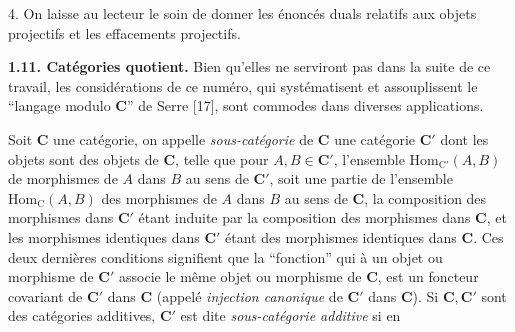  4. On laisse au lecteur le soin de donner les énoncés duals relatifs
aux objets projectifs et les effacements projectifs.

\textbf{1.11. Catégories quotient.} Bien qu'elles ne serviront pas
dans la suite de ce travail, les considérations de ce numéro, qui
systématisent et assouplissent le ``langage modulo $\mathbf{C}$'' de Serre [17], sont
commodes dans diverses applications.

Soit $\mathbf{C}$ une catégorie, on appelle \textit{sous-catégorie} de $\mathbf{C}$ une catégorie
$\mathbf{C}'$ dont les objets sont des objets de $\mathbf{C}$, telle que pour $A,B\in \mathbf{C}'$,
l'ensemble $\mathrm{Hom}_{\mathrm{C}'}(A,B)$ de morphismes de $A$ dans $B$ au sens de
$\mathbf{C}'$, soit une partie de l'ensemble $\mathrm{Hom}_{\mathrm{C}}(A,B)$ des morphismes de
$A$ dans $B$ au sens de $\mathbf{C}$, la composition des morphismes dans $\mathbf{C}'$ étant
induite par la composition des morphismes dans $\mathbf{C}$, et les morphismes
identiques dans $\mathbf{C}'$ étant des morphismes identiques dans $\mathbf{C}$. Ces deux
dernières conditions signifient que la ``fonction'' qui à un objet ou
morphisme de $\mathbf{C}'$ associe le même objet ou morphisme de $\mathbf{C}$, est un foncteur
covariant de $\mathbf{C}'$ dans $\mathbf{C}$ (appelé \textit{injection canonique} de $\mathbf{C}'$ dans
$\mathbf{C}$). Si $\mathbf{C},\mathbf{C}'$ sont des catégories additives, $\mathbf{C}'$ est dite
\textit{sous-catégorie additive} si en

